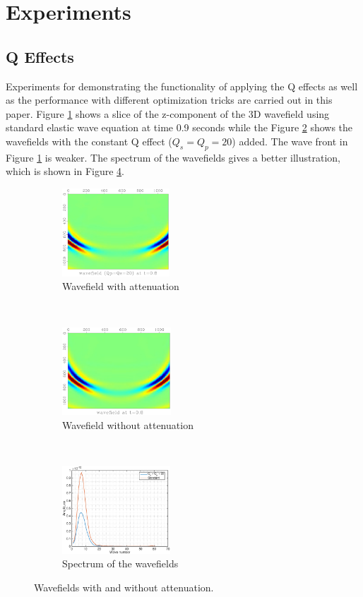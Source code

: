 \documentclass{paris17}
\begin{document}
\section{Experiments}

\subsection{Q Effects}
Experiments for demonstrating the functionality of applying the Q effects as well as  the performance with different optimization tricks are carried out in this paper. Figure \ref{fig:with-attenuation} shows a slice of the z-component of the 3D wavefield using standard elastic wave equation at time 0.9 seconds while the Figure \ref{fig:without-attenuation} shows the wavefields with the constant Q effect ($Q_s=Q_p=20$) added. The wave front in Figure \ref{fig:with-attenuation} is weaker. The spectrum of the wavefields gives a better illustration, which is shown in Figure \ref{fig:spectrum}.

\begin{figure}[h]
    \centering
    \begin{subfigure}[b]{0.3\textwidth}
        \centering
        \includegraphics[height=1.3in]{./fig/q20.pdf}
        \caption{Wavefield with attenuation}
        \label{fig:with-attenuation}
    \end{subfigure}
    ~
    \begin{subfigure}[b]{0.3\textwidth}
        \centering
        \includegraphics[height=1.3in]{./fig/std.pdf}
        \caption{Wavefield without attenuation}
        \label{fig:without-attenuation}
    \end{subfigure}%
    ~
    \begin{subfigure}[b]{0.3\textwidth}
        \centering
        \includegraphics[height=1.3in]{./fig/spec.eps}
        \caption{Spectrum of the wavefields}
        \label{fig:spectrum}
    \end{subfigure}
    \caption{Wavefields with and without attenuation.}
\end{figure}
\end{document}
